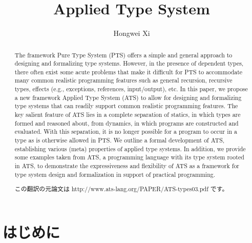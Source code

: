 \documentclass[submit,techreq,noauthor]{ipsj}
\begin{document}
\title{Applied Type System}

\author{Hongwei Xi}{}{}

\begin{abstract}
The framework Pure Type System (PTS) offers a simple and general approach to designing and formalizing type systems. However, in the presence of dependent types, there often exist some acute problems that make it difficult for PTS to accommodate many common realistic programming features such as general recursion, recursive types, effects (e.g., exceptions, references, input/output), etc. In this paper, we propose a new framework Applied Type System (ATS) to allow for designing and formalizing type systems that can readily support common realistic programming features. The key salient feature of ATS lies in a complete separation of statics, in which types are formed and reasoned about, from dynamics, in which programs are constructed and evaluated. With this separation, it is no longer possible for a program to occur in a type as is otherwise allowed in PTS. We outline a formal development of ATS, establishing various (meta) properties of applied type systems. In addition, we provide some examples taken from ATS, a programming language with its type system rooted in ATS, to demonstrate the expressiveness and flexibility of ATS as a framework for type system design and formalization in support of practical programming.

この翻訳の元論文は http://www.ats-lang.org/PAPER/ATS-types03.pdf です。
\end{abstract}

\maketitle

\section{はじめに}


\begin{acknowledgment}
\end{acknowledgment}

\begin{thebibliography}{10}
\end{thebibliography}
\end{document}
